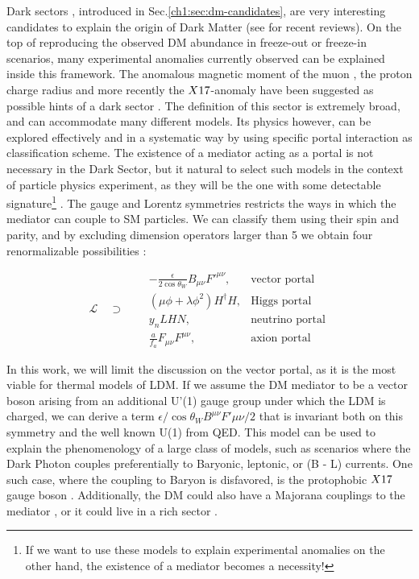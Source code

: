 Dark sectors , introduced in Sec.\ref{ch1:sec:dm-candidates}, are very interesting candidates to explain the origin of Dark Matter (see \cite{battaglieri2017cosmic,alex2016dark} for recent reviews). On the top of reproducing the observed DM abundance in freeze-out or freeze-in scenarios, many experimental anomalies currently observed can be explained inside this framework. The anomalous magnetic moment of the muon \cite{blum2013muon}, the proton charge radius \cite{Pohl2010} and more recently the $X17$-anomaly \cite{Krasznahorkay:2015iga,Krasznahorkay:2019lyl} have been suggested as possible hints of a dark sector \cite{alex2016dark}. The definition of this sector is extremely broad, and can accommodate many different models. Its physics however, can be explored effectively and in a systematic way by using specific portal interaction as classification scheme.  The existence of a mediator acting as a portal is not necessary in the Dark Sector, but it natural to select such models in the context of particle physics experiment, as they will be the one with some detectable signature\footnote{If we want to use these models to explain experimental anomalies on the other hand, the existence of a mediator becomes a necessity!} \cite{prw, pospelov}. The gauge and Lorentz symmetries restricts the ways in which the mediator can couple to SM particles. We can classify them using their spin and parity, and by excluding dimension operators larger than 5 we obtain four renormalizable possibilities \cite{alex2016dark}:

\begin{equation}
  \label{eq:dm-portals}
  \mathcal{L} \quad \supset \quad
\begin{aligned}
  &-\frac{\epsilon}{2 \cos{\theta_W}}B_{\mu \nu}F'^{\mu \nu}, &\textrm{vector portal}\\
  & (\mu \phi + \lambda \phi^2)H^{\dagger}H, &\textrm{Higgs portal}\\
  &y_n LHN, &\textrm{neutrino portal} \\
  &\frac{a}{f_a} F_{\mu \nu} F^{\mu \nu}, &\textrm{axion portal}
\end{aligned}
\end{equation}

In this work, we will limit the discussion on the vector portal, as it is the most viable for thermal models of LDM. If we assume the DM mediator to be a vector boson arising from an additional U'(1) gauge group under which the LDM is charged, we can derive a term $\epsilon / \cos{\theta_W} B^{\mu \nu} F'{\mu \nu}/2$ that is invariant both on this symmetry and the well known U(1) from QED. This model can be used to explain the phenomenology of a large class of models, such as scenarios where the Dark Photon couples preferentially to Baryonic, leptonic, or (B - L) currents. One such case, where the coupling to Baryon is disfavored, is the protophobic $X17$ gauge boson \cite{PhysRevD.95.035017}. Additionally, the DM could also have a Majorana couplings to the mediator \cite{PhysRevD.93.063523}, or it could live in a rich sector \cite{Morrissey_2014}.


